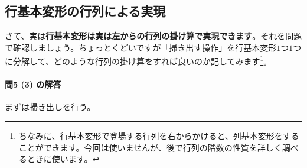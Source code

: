 \subsection{行基本変形の行列による実現}

さて、実は\textbf{行基本変形は実は左からの行列の掛け算で実現できます}。それを問題で確認しましょう。ちょっとくどいですが「掃き出す操作」を行基本変形$1$つ$1$つに分解して、どのような行列の掛け算をすれば良いのか記してみます\footnote{ちなみに、行基本変形で登場する行列を\uline{右から}かけると、列基本変形をすることができます。今回は使いませんが、後で行列の階数の性質を詳しく調べるときに使います。}。

\paragraph{問5 (3) の解答} まずは掃き出しを行う。
